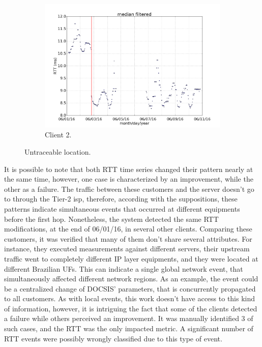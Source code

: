 \begin{figure}[H]
{\begin{subfigure}[b]{0.55\textwidth}
            \includegraphics[width=\textwidth]{./figures/results/wrong_examples/untraceable_example/serverBHZDTCLDM062_mac64:66:B3:50:00:B6_dtstart2016-06-01_dtend2016-06-11.png}
            \caption{Client 2.}\label{fig:untraceable_location_client_2}
        \end{subfigure}%
    }
    \caption{Untraceable location.}
\label{fig:untraceable_location}
\end{figure}%

It is possible to note that both RTT time series changed their pattern
nearly at the same time, however, one case is characterized by an improvement,
while the other as a failure.
The traffic between these customers and the server
doesn't go to through the Tier-2 \gls*{isp}, therefore, according with the
suppositions, these patterns indicate simultaneous events that occurred at
different equipments before the first hop.
Nonetheless, the system detected the same RTT modifications, at the end of
06/01/16, in several other clients.
Comparing these customers, it was verified that many of them don't share
several attributes.
For instance, they executed measurements against different servers, their
upstream traffic went to completely different IP layer equipments, and they
were located at different Brazilian UFs.
This can indicate a single global network event, that simultaneously affected
different network regions. As an example, the event could be a centralized
change of DOCSIS' parameters, that is concurrently propagated to all customers.
As with local events, this work doesn't have access to this kind of
information, however, it is intriguing the fact that some of the clients
detected a failure while others perceived an improvement.
It was manually identified 3 of such cases,
and the RTT was the only impacted metric.
A significant number of RTT events were possibly wrongly classified due to this
type of event.

